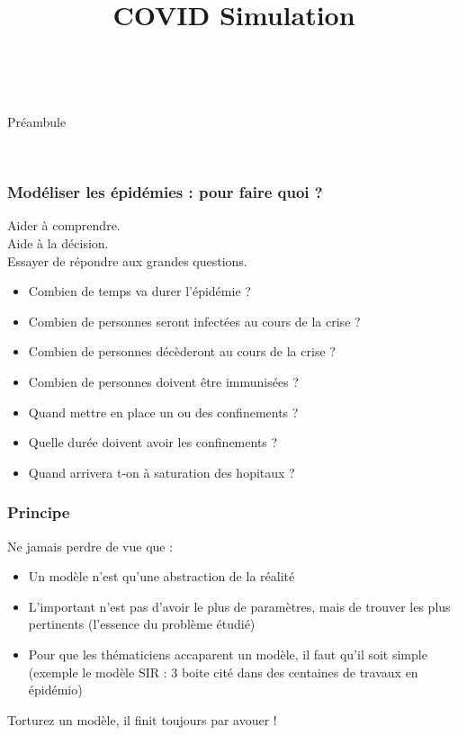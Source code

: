 \documentclass[a4paper]{cours-bdd}
\title{COVID Simulation}
\begin{document}
\frame{\titlepage}




\begin{frame}
  \hfill \
  \begin{center}
    \Huge
    Préambule
  \end{center}
  \hfill \

\end{frame}




\begin{frame}[fragile]
  \frametitle{Modéliser les épidémies : pour faire quoi ?}

  Aider à comprendre.\\
  Aide à la décision.\\
  Essayer de répondre aux grandes questions. \\
  \begin{itemize}
  \item Combien de temps va durer l’épidémie ?
  \item Combien de personnes seront infectées au cours de la crise ? 
  \item Combien de personnes décèderont au cours de la crise ? 
  \item Combien de personnes doivent être immunisées ?
  \item Quand mettre en place un ou des confinements ?
  \item Quelle durée doivent avoir les confinements ?
  \item Quand arrivera t-on à saturation des hopitaux ?
  \end{itemize}
  
\end{frame}


\begin{frame}[fragile]
  \frametitle{Principe}

  Ne jamais perdre de vue que  :
  \begin{itemize}
  \item Un modèle n'est qu'une abstraction de la réalité
  \item L'important n'est pas d'avoir le plus de paramètres, mais de trouver les plus pertinents (l'essence du problème étudié)
  \item Pour que les thématiciens accaparent un modèle, il faut qu'il soit simple (exemple le modèle SIR : 3 boite cité dans des centaines de travaux en épidémio)
  \end{itemize}

  \bigskip
  
  \begin{block}{}
    \begin{center}
  Torturez un modèle, il finit toujours par avouer !
\end{center}
\end{block}

\end{frame}
\end{document}
